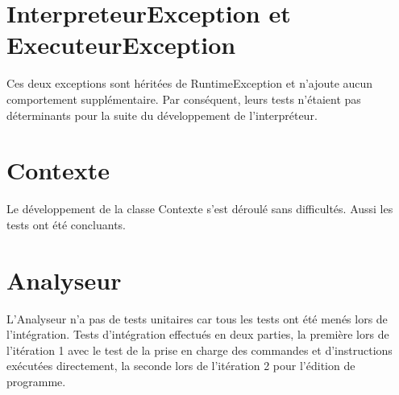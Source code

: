 
\section{InterpreteurException et ExecuteurException}

Ces deux exceptions sont héritées de RuntimeException et n'ajoute aucun
comportement supplémentaire. Par conséquent, leurs tests n'étaient pas
déterminants pour la suite du développement de l'interpréteur.

\section{Contexte}

Le développement de la classe Contexte s'est déroulé sans difficultés.
Aussi les tests ont été concluants.

\section{Analyseur}

L'Analyseur n'a pas de tests unitaires car tous les tests ont été menés
lors de l'intégration. Tests d'intégration effectués en deux parties,
la première lors de l'itération 1 avec le test de la prise en charge
des commandes et d'instructions exécutées directement, la seconde lors de
l'itération 2 pour l'édition de programme.


